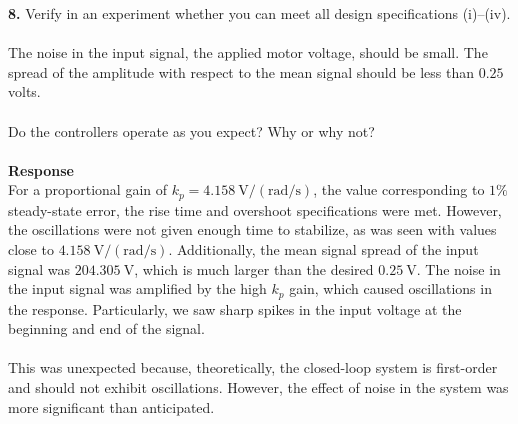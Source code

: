 ﻿\documentclass[12pt]{article}
\begin{document}
\textbf{8.} Verify in an experiment whether you can meet all design specifications (i)--(iv).\\\\
The noise in the input signal, the applied motor voltage, should be small. The spread of the amplitude with respect to the mean signal should be less than $0.25$ volts.\\\\
Do the controllers operate as you expect? Why or why not?\\\\
\textbf{Response}\\
For a proportional gain of $k_p = 4.158~\mathrm{V/(rad/s)}$, the value corresponding to $1\%$ steady-state error, the rise time and overshoot specifications were met. However, the oscillations were not given enough time to stabilize, as was seen with values close to $4.158~\mathrm{V/(rad/s)}$. Additionally, the mean signal spread of the input signal was $204.305~\mathrm{V}$, which is much larger than the desired $0.25~\mathrm{V}$. The noise in the input signal was amplified by the high $k_p$ gain, which caused oscillations in the response. Particularly, we saw sharp spikes in the input voltage at the beginning and end of the signal.\\\\
This was unexpected because, theoretically, the closed-loop system is first-order and should not exhibit oscillations. However, the effect of noise in the system was more significant than anticipated.
\newpage
\end{document}

